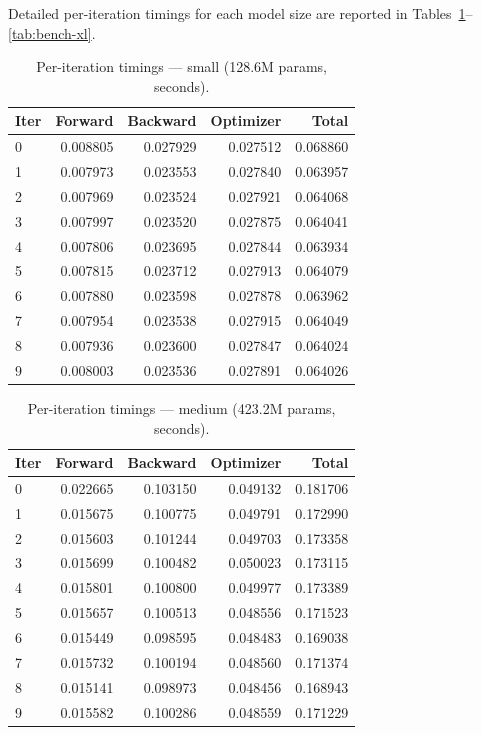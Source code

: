 \documentclass[11pt]{article}
\begin{document}
Detailed per-iteration timings for each model size are reported in
Tables~\ref{tab:bench-small}--\ref{tab:bench-xl}.

\begin{table}[H]
\centering
\caption{Per-iteration timings --- small (128.6M params, seconds).}
\label{tab:bench-small}
\begin{tabular}{lrrrr}
  \toprule
  Iter & Forward & Backward & Optimizer & Total \\
  \midrule
  0 & 0.008805 & 0.027929 & 0.027512 & 0.068860 \\
  1 & 0.007973 & 0.023553 & 0.027840 & 0.063957 \\
  2 & 0.007969 & 0.023524 & 0.027921 & 0.064068 \\
  3 & 0.007997 & 0.023520 & 0.027875 & 0.064041 \\
  4 & 0.007806 & 0.023695 & 0.027844 & 0.063934 \\
  5 & 0.007815 & 0.023712 & 0.027913 & 0.064079 \\
  6 & 0.007880 & 0.023598 & 0.027878 & 0.063962 \\
  7 & 0.007954 & 0.023538 & 0.027915 & 0.064049 \\
  8 & 0.007936 & 0.023600 & 0.027847 & 0.064024 \\
  9 & 0.008003 & 0.023536 & 0.027891 & 0.064026 \\
  \bottomrule
\end{tabular}
\end{table}

\begin{table}[H]
\centering
\caption{Per-iteration timings --- medium (423.2M params, seconds).}
\label{tab:bench-medium}
\begin{tabular}{lrrrr}
  \toprule
  Iter & Forward & Backward & Optimizer & Total \\
  \midrule
  0 & 0.022665 & 0.103150 & 0.049132 & 0.181706 \\
  1 & 0.015675 & 0.100775 & 0.049791 & 0.172990 \\
  2 & 0.015603 & 0.101244 & 0.049703 & 0.173358 \\
  3 & 0.015699 & 0.100482 & 0.050023 & 0.173115 \\
  4 & 0.015801 & 0.100800 & 0.049977 & 0.173389 \\
  5 & 0.015657 & 0.100513 & 0.048556 & 0.171523 \\
  6 & 0.015449 & 0.098595 & 0.048483 & 0.169038 \\
  7 & 0.015732 & 0.100194 & 0.048560 & 0.171374 \\
  8 & 0.015141 & 0.098973 & 0.048456 & 0.168943 \\
  9 & 0.015582 & 0.100286 & 0.048559 & 0.171229 \\
  \bottomrule
\end{tabular}
\end{table}
\end{document}
